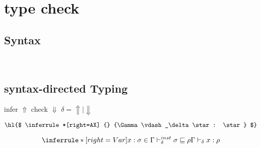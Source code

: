 \section{type check}

\subsection{Syntax}
\gram{\otte\ottinterrule
      \ottS\ottinterrule
      \ottR\ottinterrule
  }
\\[2.0mm]


\subsection{syntax-directed Typing}

\newcommand{\pgm}{\mathsf{P}}
\newcommand{\nat}{\mathsf{nat}}
\newcommand{\logic}{\mathsf{L}}
\newcommand{\judge}{\Gamma\vdash}

\newcommand{\checktype}{\Gamma\vdash_\Downarrow}
\newcommand{\infertype}{\Gamma\vdash_\Uparrow}
\newcommand{\infercheck}{\Gamma\vdash_\delta}

\newcommand{\checktypeno}{\vdash_\Downarrow}
\newcommand{\infertypeno}{\vdash_\Uparrow}
\newcommand{\infercheckno}{\vdash_\delta}

\newcommand{\instinfer}{\vdash^{inst}_\Uparrow}
\newcommand{\instcheck}{\vdash^{inst}_\Downarrow}
\newcommand{\instinfercheck}{\vdash^{inst}_\delta}

\newcommand{\polyinfer}{\vdash^{poly}_\Uparrow}
\newcommand{\polycheck}{\vdash^{poly}_\Downarrow}
\newcommand{\polyinfercheck}{\vdash^{poly}_\delta}

\newcommand{\polymorphic}{\vdash^{dsk}}
\newcommand{\polymorphicstar}{\vdash^{dsk\star}}

\newcommand{\substlet}{\textcolor{blue}{subst\_let}}


\framebox{$ \judge e : \sigma$ } infer $\Uparrow$ check $\Downarrow$ $\delta = \Uparrow \mid \Downarrow$

\[
\hl{$
\inferrule*[right=AX]
{} {\infercheck \star : \star}
$}
\]

\[
\inferrule*[right=Var]
{x:\sigma \in \Gamma \\ \instinfercheck \sigma \sqsubseteq \rho } {\infercheck x : \rho}
\]

